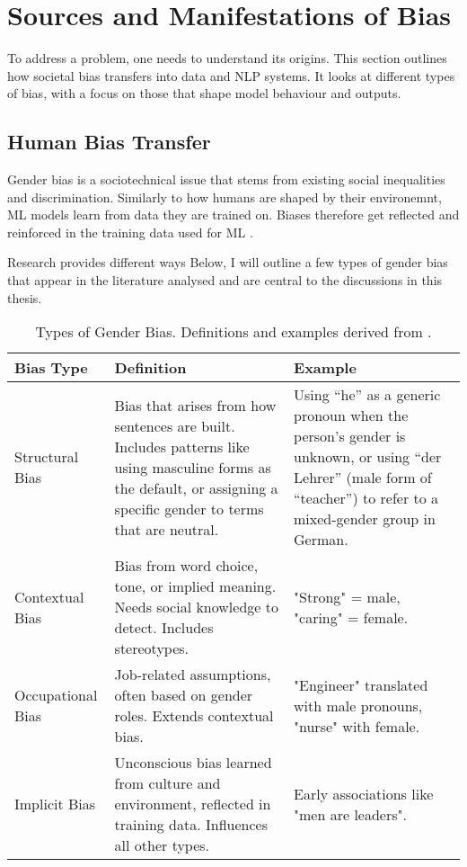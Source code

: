\section{Sources and Manifestations of Bias}

To address a problem, one needs to understand its origins. This section outlines how societal bias transfers into data and NLP systems. It looks at different types of bias, with a focus on those that shape model behaviour and outputs.

\subsection{Human Bias Transfer}
Gender bias is a sociotechnical issue that stems from existing social inequalities and discrimination. Similarly to how humans are shaped by their environemnt, ML models learn from data they are trained on. Biases therefore get reflected and reinforced in the training data used for ML \citep{stanczakSurveyGenderBias2021,smacchiaDoesAIReflect2024}. 





Research provides different ways 
Below, I will outline a few types of gender bias that appear in the literature analysed and are central to the discussions in this thesis. 

\renewcommand{\arraystretch}{1.3}
\begin{table}[ht]
\centering
\begin{tabularx}{\textwidth}{|>{\raggedright\arraybackslash}p{3.5cm}|>{\raggedright\arraybackslash}X|>{\raggedright\arraybackslash}X|}
\hline
\textbf{Bias Type} & \textbf{Definition} & \textbf{Example} \\
\hline

Structural Bias & Bias that arises from how sentences are built. Includes patterns like using masculine forms as the default, or assigning a specific gender to terms that are neutral. & Using “he” as a generic pronoun when the person’s gender is unknown, or using “der Lehrer” (male form of “teacher”) to refer to a mixed-gender group in German. \\
\hline

Contextual Bias & Bias from word choice, tone, or implied meaning. Needs social knowledge to detect. Includes stereotypes. & "Strong" = male, "caring" = female. \\
\hline

Occupational Bias & Job-related assumptions, often based on gender roles. Extends contextual bias. & "Engineer" translated with male pronouns, "nurse" with female. \\
\hline

Implicit Bias & Unconscious bias learned from culture and environment, reflected in training data. Influences all other types. & Early associations like "men are leaders". \\
\hline
\end{tabularx}
\caption{Types of Gender Bias. Definitions and examples derived from \citet{stanczakSurveyGenderBias2021,ullmannGenderBiasMachine2022,kapplAreAllSpanish2025,godsilEffectsGenderRoles2016}.}
\label{tab:types_of_gender_bias}
\end{table}

